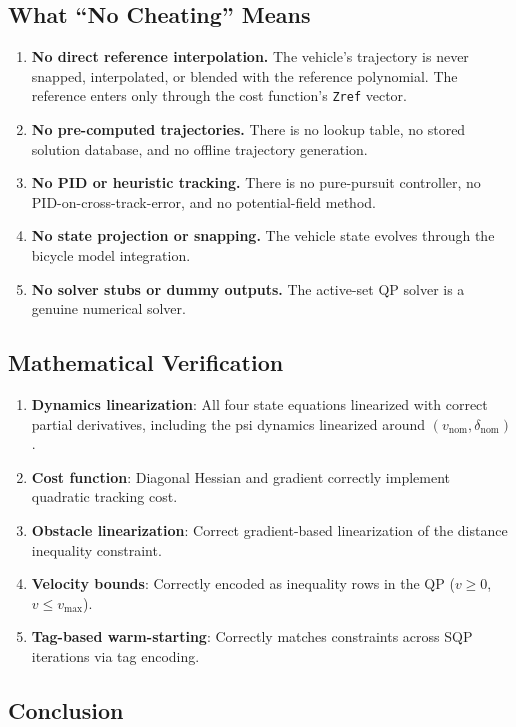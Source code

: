 ﻿\documentclass[11pt,a4paper]{article}
\begin{document}
\subsection{What ``No Cheating'' Means}
\begin{enumerate}[leftmargin=1.2cm]
  \item \textbf{No direct reference interpolation.} The vehicle's trajectory is never snapped, interpolated, or blended with the reference polynomial. The reference enters only through the cost function's \texttt{Zref} vector.
  \item \textbf{No pre-computed trajectories.} There is no lookup table, no stored solution database, and no offline trajectory generation.
  \item \textbf{No PID or heuristic tracking.} There is no pure-pursuit controller, no PID-on-cross-track-error, and no potential-field method.
  \item \textbf{No state projection or snapping.} The vehicle state evolves through the bicycle model integration.
  \item \textbf{No solver stubs or dummy outputs.} The active-set QP solver is a genuine numerical solver.
\end{enumerate}

\subsection{Mathematical Verification}
\begin{enumerate}[leftmargin=1.2cm]
  \item \textbf{Dynamics linearization}: All four state equations linearized with correct partial derivatives, including the psi dynamics linearized around $(v_{\text{nom}}, \delta_{\text{nom}})$.
  \item \textbf{Cost function}: Diagonal Hessian and gradient correctly implement quadratic tracking cost.
  \item \textbf{Obstacle linearization}: Correct gradient-based linearization of the distance inequality constraint.
  \item \textbf{Velocity bounds}: Correctly encoded as inequality rows in the QP ($v \geq 0$, $v \leq v_{\max}$).
  \item \textbf{Tag-based warm-starting}: Correctly matches constraints across SQP iterations via tag encoding.
\end{enumerate}

\subsection{Conclusion}
\end{document}
